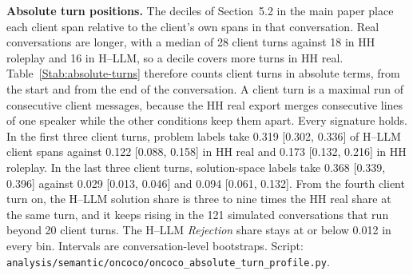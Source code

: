 \documentclass[fleqn,10pt]{JLA_article}
\newcommand{\fitwidth}[1]{\resizebox{\ifdim\width>\linewidth \linewidth\else \width\fi}{!}{#1}}
\begin{document}
\textbf{Absolute turn positions.} The deciles of Section~5.2 in the main paper place each client span relative to the client's own spans in that conversation. Real conversations are longer, with a median of 28 client turns against 18 in HH roleplay and 16 in H--LLM, so a decile covers more turns in HH real. Table~\ref{Stab:absolute-turns} therefore counts client turns in absolute terms, from the start and from the end of the conversation. A client turn is a maximal run of consecutive client messages, because the HH real export merges consecutive lines of one speaker while the other conditions keep them apart. Every signature holds. In the first three client turns, problem labels take 0.319 [0.302, 0.336] of H--LLM client spans against 0.122 [0.088, 0.158] in HH real and 0.173 [0.132, 0.216] in HH roleplay. In the last three client turns, solution-space labels take 0.368 [0.339, 0.396] against 0.029 [0.013, 0.046] and 0.094 [0.061, 0.132]. From the fourth client turn on, the H--LLM solution share is three to nine times the HH real share at the same turn, and it keeps rising in the 121 simulated conversations that run beyond 20 client turns. The H--LLM \emph{Rejection} share stays at or below 0.012 in every bin. Intervals are conversation-level bootstraps. Script: \texttt{analysis/semantic/oncoco/oncoco\_absolute\_turn\_profile.py}.

\begin{table}[t]
\caption{Conversation-resampled and student-resampled 95\% intervals for the proximity gaps and the per-model distances to HH real. Students are the platform's course-member accounts within each export. HH real and HH roleplay are resampled by conversation in both columns.}
\label{Stab:students}
\centering
\footnotesize
\setlength{\tabcolsep}{4pt}
\fitwidth{}
\end{table}

\begin{table}[t]
\caption{Client-side signature shares by absolute client turn, aligned at the start and at the end of the conversation. A client turn is a maximal run of consecutive client messages. Shares are of all client spans in the bin, pooled over conversations. Problem disclosure is \emph{Problem statement} and \emph{Problem definition}. Solution space is the feedback on recommendations, the report on their implementation, and the two resource-activation labels, as in Section~5.2 of the main paper.}
\label{Stab:absolute-turns}
\centering
\footnotesize
\setlength{\tabcolsep}{4pt}
\fitwidth{}
\end{table}
\end{document}
